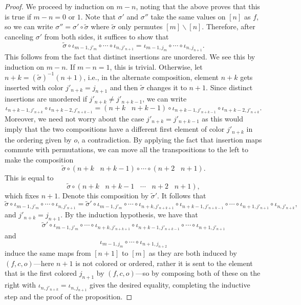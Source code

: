 \documentclass[10pt,a4paper]{amsart}
\begin{document}
\begin{proof}
We proceed by induction on $m-n$, noting that the above proves that this is true if $m-n=0$ or $1$.
Note that $\sigma'$ and $\sigma''$ take the same values on $[n]$ as $f$, so we can write $\sigma''=\sigma'\circ \tilde{\sigma}$ where $\tilde{\sigma}$ only permutes $[m]\backslash[n]$.
Therefore, after canceling $\sigma'$ from both sides, it suffices to show that 
\[
\tilde{\sigma}\circ\iota_{m-1, j'_{m}}\circ\cdots\circ\iota_{n, j'_{n+1}}=\iota_{m-1, j_{m}}\circ \cdots\circ\iota_{n, j_{n+1}}.
\]
This follows from the fact that distinct insertions are unordered.
We see this by induction on $m-n$.
If $m-n=1$, this is trivial.
Otherwise, let $n+k=(\tilde{\sigma})^{-1}(n+1)$, i.e., in the alternate composition, element $n+k$ gets inserted with color $j'_{n+k}=j_{n+1}$ and then $\tilde{\sigma}$ changes it to $n+1$.
Since distinct insertions are unordered if $j'_{n+k}\neq j'_{n+k-1}$, we can write
\[
\iota_{n+k-1, j'_{n+k}}\circ\iota_{n+k-2, j'_{n+k-1}}=(n+k\;\;\;n+k-1)\circ \iota_{n+k-1, j'_{n+k-1}}\circ\iota_{n+k-2, j'_{n+k}}.
\]
Moreover, we need not worry about the case $j'_{n+k}=j'_{n+k-1}$ as this would imply that the two compositions have a different first element of color $j'_{n+k}$ in the ordering given by $o$, a contradiction.
By applying the fact that insertion maps commute with permutations, we can move all the transpositions to the left to make the composition
\[
\tilde{\sigma}\circ (n+k\;\;\; n+k-1)\circ\cdots\circ (n+2\;\;\; n+1).
\]
This is equal to 
\[
\tilde{\sigma}\circ(n+k\;\;\;n+k-1\;\;\;\cdots\;\;\; n+2\;\;\; n+1),
\]
which fixes $n+1$.
Denote this composition by $\tilde{\sigma}'$.
It follows that
\[
\tilde{\sigma}\circ\iota_{m-1, j'_{m}}\circ\cdots\circ\iota_{n, j'_{n+1}}=\tilde{\sigma}'\circ \iota_{m-1, j'_{m}}\circ\cdots\circ\iota_{n+k, j'_{n+k+1}}\circ \iota_{n+k-1, j'_{n+k-1}}\circ\cdots\circ\iota_{n+1, j'_{n+1}}\circ\iota_{n, j'_{n+k}},
\]
and $j'_{n+k}=j_{n+1}$.
By the induction hypothesis, we have that 
\[
\tilde{\sigma}'\circ \iota_{m-1, j'_{m}}\circ\cdots\circ\iota_{n+k, j'_{n+k+1}}\circ\iota_{n+k-1, j'_{n+k-1}}\circ\cdots\circ\iota_{n+1, j'_{n+1}}
\]
and
\[
\iota_{m-1, j_{m}}\circ\cdots\circ\iota_{n+1, j_{n+2}}
\]
induce the same maps from $[n+1]$ to $[m]$ as they are both induced by $(f, c, o)$---here $n+1$ is not colored or ordered, rather it is sent to the element that is the first colored $j_{n+1}$ by  $(f, c, o)$---so by composing both of these on the right with $\iota_{n, j'_{n+k}}=\iota_{n, j_{n+1}}$ gives the desired equality, completing the inductive step and the proof of the proposition.
\end{proof}
\end{document}
